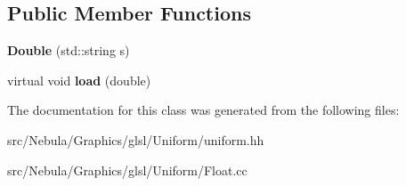 \subsection*{\-Public \-Member \-Functions}
\begin{DoxyCompactItemize}
\item 
\hypertarget{classNeb_1_1glsl_1_1Uniform_1_1Scalar_1_1Double_a69bb07fb2fa171a1067bf7558b91ec57}{{\bfseries \-Double} (std\-::string s)}\label{classNeb_1_1glsl_1_1Uniform_1_1Scalar_1_1Double_a69bb07fb2fa171a1067bf7558b91ec57}

\item 
\hypertarget{classNeb_1_1glsl_1_1Uniform_1_1Scalar_1_1Double_aa3e09a61118c65d3af510b3f7b8080ec}{virtual void {\bfseries load} (double)}\label{classNeb_1_1glsl_1_1Uniform_1_1Scalar_1_1Double_aa3e09a61118c65d3af510b3f7b8080ec}

\end{DoxyCompactItemize}


\-The documentation for this class was generated from the following files\-:\begin{DoxyCompactItemize}
\item 
src/\-Nebula/\-Graphics/glsl/\-Uniform/uniform.\-hh\item 
src/\-Nebula/\-Graphics/glsl/\-Uniform/\-Float.\-cc\end{DoxyCompactItemize}
